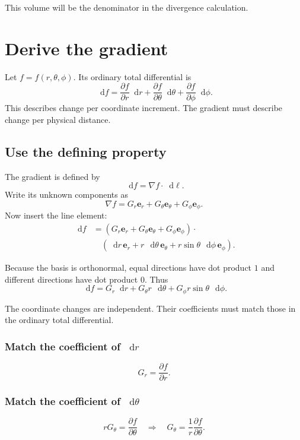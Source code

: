 \documentclass[11pt,a4paper]{article}
\newcommand{\er}{\bm e_r}
\newcommand{\etheta}{\bm e_\theta}
\newcommand{\ephi}{\bm e_\phi}
\newcommand{\dd}{\mathop{}\!\mathrm d}
\begin{document}
This volume will be the denominator in the divergence calculation.

\clearpage

\section{Derive the gradient}

Let \(f=f(r,\theta,\phi)\). Its ordinary total differential is
\[
  \dd f
  =\frac{\partial f}{\partial r}\dd r
  +\frac{\partial f}{\partial\theta}\dd\theta
  +\frac{\partial f}{\partial\phi}\dd\phi.
\]
This describes change per coordinate increment. The gradient must describe change per physical distance.

\subsection{Use the defining property}

The gradient is defined by
\[
  \dd f=\nabla f\cdot\dd\bm\ell.
\]
Write its unknown components as
\[
  \nabla f=G_r\er+G_\theta\etheta+G_\phi\ephi.
\]
Now insert the line element:
\begin{align*}
  \dd f
  &=(G_r\er+G_\theta\etheta+G_\phi\ephi)\cdot\\
  &\quad(\dd r\,\er+r\,\dd\theta\,\etheta
  +r\sin\theta\,\dd\phi\,\ephi).
\end{align*}

Because the basis is orthonormal, equal directions have dot product \(1\) and different directions have dot product \(0\). Thus
\[
  \dd f
  =G_r\dd r+G_\theta r\,\dd\theta
  +G_\phi r\sin\theta\,\dd\phi.
\]

The coordinate changes are independent. Their coefficients must match those in the ordinary total differential.

\subsubsection*{Match the coefficient of \(\dd r\)}

\[
  G_r=\frac{\partial f}{\partial r}.
\]

\subsubsection*{Match the coefficient of \(\dd\theta\)}

\[
  rG_\theta=\frac{\partial f}{\partial\theta}
  \quad\Longrightarrow\quad
  G_\theta=\frac{1}{r}\frac{\partial f}{\partial\theta}.
\]
\end{document}
